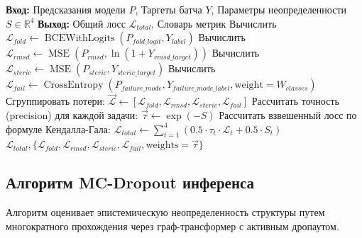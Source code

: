 \documentclass[12pt, a4paper]{article}
\begin{document}
\begin{algorithm}[h]
\caption{Расчет функции потерь DynamicMultiTaskLoss}
\label{alg:loss}
\begin{algorithmic}[1]
\Statex \textbf{Вход:} Предсказания модели $P$, Таргеты батча $Y$, Параметры неопределенности $S \in \mathbb{R}^4$
\Statex \textbf{Выход:} Общий лосс $\mathcal{L}_{total}$, Словарь метрик
\State Вычислить $\mathcal{L}_{fold} \gets \operatorname{BCEWithLogits}(P_{fold\_logit}, Y_{label})$
\State Вычислить $\mathcal{L}_{rmsd} \gets \operatorname{MSE}(P_{rmsd}, \ln(1 + Y_{rmsd\_target}))$
\State Вычислить $\mathcal{L}_{steric} \gets \operatorname{MSE}(P_{steric}, Y_{steric\_target})$
\State Вычислить $\mathcal{L}_{fail} \gets \operatorname{CrossEntropy}(P_{failure\_mode}, Y_{failure\_mode\_label}, \text{weight}=W_{classes})$
\State Сгруппировать потери: $\vec{\mathcal{L}} \gets [\mathcal{L}_{fold}, \mathcal{L}_{rmsd}, \mathcal{L}_{steric}, \mathcal{L}_{fail}]$
\State Рассчитать точность (precision) для каждой задачи: $\vec{\tau} \gets \exp(-S)$
\State Рассчитать взвешенный лосс по формуле Кендалла-Гала:
\State \quad $\mathcal{L}_{total} \gets \sum_{t=1}^4 \left( 0.5 \cdot \tau_t \cdot \mathcal{L}_t + 0.5 \cdot S_t \right)$
\State \Return $\mathcal{L}_{total}, \{ \mathcal{L}_{fold}, \mathcal{L}_{rmsd}, \mathcal{L}_{steric}, \mathcal{L}_{fail}, \text{weights}=\vec{\tau} \}$
\end{algorithmic}
\end{algorithm}

\subsection{Алгоритм MC-Dropout инференса}
Алгоритм оценивает эпистемическую неопределенность структуры путем многократного прохождения через граф-трансформер с активным дропаутом.
\end{document}
